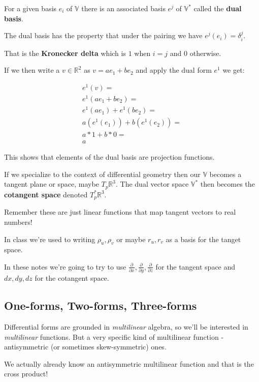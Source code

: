 \documentclass{article}
\begin{document}
For a given basis $e_{i}$ of $\mathbb{V}$ there is an associated basis $e^{j}$
of $\mathbb{V}^{*}$ called the \textbf{dual basis}.

The dual basis has the property that under the pairing we have $e^{j}(e_{i}) = \delta^{j}_{i}$.

That is the \textbf{Kronecker delta} which is $1$ when $i = j$ and $0$
otherwise.

If we then write a $v \in \mathbb{R}^{2}$ as $v = ae_{1} + be_{2}$ and apply the
dual form $e^{1}$ we get:

\begin{align*}
  e^{1} (v) = \\
  e^{1}(ae_{1} + be_{2}) = \\
  e^{1}(ae_{1}) + e^{1}(be_{2}) = \\
  a(e^{1}(e_{1})) + b(e^{1}(e_{2})) = \\
  a * 1 + b * 0 = \\
  a
\end{align*}

This shows that elements of the dual basis are projection functions.

If we specialize to the context of differential geometry then our $\mathbb{V}$
becomes a tangent plane or space, maybe $T_{p}\mathbb{R}^{3}$. The dual vector space $\mathbb{V}^{*}$ then becomes the \textbf{cotangent space}
denoted $T_{p}^{*}\mathbb{R}^{3}$.

Remember these are just linear functions that
map tangent vectors to real numbers!

In class we're used to writing $\rho_{u}, \rho_{v}$ or maybe $r_{u}, r_{v}$ as a
basis for the tanget space.

In these notes we're going to try to use $\frac{\partial}{\partial x}, \frac{\partial}{\partial
  y}, \frac{\partial}{\partial z}$ for the tangent space and $dx, dy, dz$ for the cotangent space.

\subsection{One-forms, Two-forms, Three-forms}

Differential forms are grounded in \textit{multilinear} algebra, so we'll be
interested in \textit{multilinear} functions. But a very specific kind of
multilinear function - antisymmetric (or sometimes skew-symmetric) ones.

We actually already know an antisymmetric multilinear function and that is the
cross product!
\end{document}
